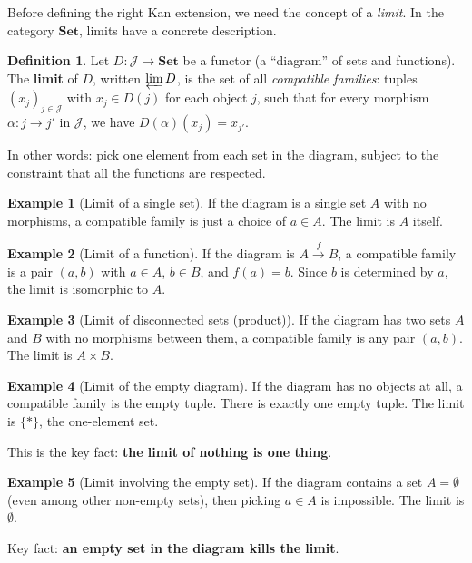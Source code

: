 \documentclass[11pt,a4paper]{article}
\theoremstyle{definition}
\newtheorem{definition}{Definition}[section]
\newtheorem{example}{Example}[section]
\theoremstyle{plain}
\newcommand{\Set}{\mathbf{Set}}
\begin{document}
Before defining the right Kan extension, we need the concept of a \emph{limit}. In the category $\Set$, limits have a concrete description.

\begin{definition}
Let $D \colon \mathcal{J} \to \Set$ be a functor (a ``diagram'' of sets and functions). The \textbf{limit} of $D$, written $\varprojlim D$, is the set of all \emph{compatible families}: tuples $(x_j)_{j \in \mathcal{J}}$ with $x_j \in D(j)$ for each object $j$, such that for every morphism $\alpha \colon j \to j'$ in $\mathcal{J}$, we have $D(\alpha)(x_j) = x_{j'}$.
\end{definition}

In other words: pick one element from each set in the diagram, subject to the constraint that all the functions are respected.

\begin{example}[Limit of a single set]
If the diagram is a single set $A$ with no morphisms, a compatible family is just a choice of $a \in A$. The limit is $A$ itself.
\end{example}

\begin{example}[Limit of a function]
\label{ex:limit-function}
If the diagram is $A \xrightarrow{f} B$, a compatible family is a pair $(a, b)$ with $a \in A$, $b \in B$, and $f(a) = b$. Since $b$ is determined by $a$, the limit is isomorphic to $A$.
\end{example}

\begin{example}[Limit of disconnected sets (product)]
\label{ex:limit-product}
If the diagram has two sets $A$ and $B$ with no morphisms between them, a compatible family is any pair $(a, b)$. The limit is $A \times B$.
\end{example}

\begin{example}[Limit of the empty diagram]
\label{ex:limit-empty}
If the diagram has no objects at all, a compatible family is the empty tuple. There is exactly one empty tuple. The limit is $\{*\}$, the one-element set.

This is the key fact: \textbf{the limit of nothing is one thing}.
\end{example}

\begin{example}[Limit involving the empty set]
\label{ex:limit-with-empty}
If the diagram contains a set $A = \emptyset$ (even among other non-empty sets), then picking $a \in A$ is impossible. The limit is $\emptyset$.

Key fact: \textbf{an empty set in the diagram kills the limit}.
\end{example}
\end{document}
